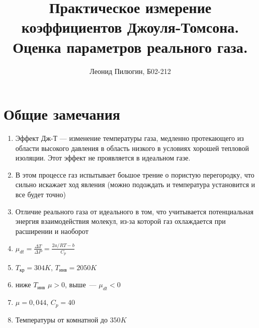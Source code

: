\documentclass[a4paper, 12pt]{article}
\title{Практическое измерение коэффициентов Джоуля-Томсона. Оценка параметров реального газа.}
\author{Леонид Пилюгин, Б02-212}
\begin{document}
    \maketitle
    \section{Общие замечания}
    \begin{enumerate}
        \item Эффект Дж-Т --- изменение температуры газа, медленно протекающего
        из области высокого давления в область низкого в условиях хорошей
        тепловой изоляции. Этот эффект не проявляется в идеальном газе.
        \item В этом процессе газ испытывает боьшое трение о пористую перегородку,
        что сильно искажает ход явления (можно подождать и температура установится и все будет точно)
        \item Отличие реального газа от идеального в том, что учитывается потенциальная
        энергия взаимодействия молекул, из-за которой газ охлаждается при расширении и наоборот
        \item $\mu_{dt}=\frac{\Delta T}{\Delta P} = \frac{2a/RT-b}{C_p}$
        \item $T_\text{кр}=304 K$, $T_\text{инв}=2050 K$
        \item ниже $T_\text{инв}$ $\mu > 0$, выше~--- $\mu_{dt} < 0$
        \item $\mu=0{,}044$, $C_p=40$
        \item Температуры от комнатной до $350 K$
    \end{enumerate}
\end{document}
